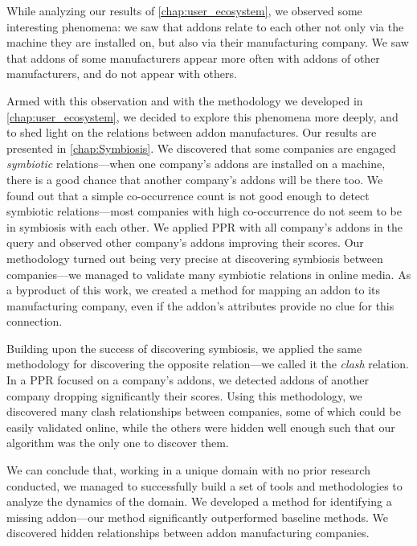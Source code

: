\documentclass[ijoc,nonblindrev]{informs3} %
\numberwithin{equation}{subsection}
\begin{document}
While analyzing our results of \autoref{chap:user_ecosystem}, we observed some interesting phenomena: we saw that addons relate to each other not only via the machine they are installed on, but also via their manufacturing company. We saw that addons of some manufacturers appear more often with addons of other manufacturers, and do not appear with others.

Armed with this observation and with the methodology we developed in \autoref{chap:user_ecosystem}, we decided to explore this phenomena more deeply, and to shed light on the relations between addon manufactures. Our results are presented in \autoref{chap:Symbiosis}.
We discovered that some companies are engaged \emph{symbiotic} relations---when one company's addons are installed on a machine, there is a good chance that another company's addons will be there too. We found out that a simple co-occurrence count is not good enough to detect symbiotic relations---most companies with high co-occurrence do not seem to be in symbiosis with each other. We applied PPR with all company's addons in the query and observed other company's addons improving their scores. Our methodology turned out being very precise at discovering symbiosis between companies---we managed to validate many symbiotic relations in online media. As a byproduct of this work, we created a method for mapping an addon to its manufacturing company, even if the addon's attributes provide no clue for this connection.

Building upon the success of discovering symbiosis, we applied the same methodology for discovering the opposite relation---we called it the \emph{clash} relation. In a PPR focused on a company's addons, we detected addons of another company dropping significantly their scores. Using this methodology, we discovered many clash relationships between companies, some of which could be easily validated online, while the others were hidden well enough such that our algorithm was the only one to discover them.

We can conclude that, working in a unique domain with no prior research conducted, we managed to successfully build a set of tools and methodologies to analyze the dynamics of the domain.
We developed a method for identifying a missing addon---our method significantly outperformed baseline methods.
We discovered hidden relationships between addon manufacturing companies.



%
\iffalse
\newpage
\appendix
\section{} 
\renewcommand{\figurename}{Appendix}
\end{document}
